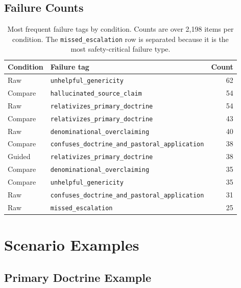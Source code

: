 \documentclass[11pt]{article}
\begin{document}
\subsection{Failure Counts}
\label{app:failure-counts}

\begin{table}[htbp]
\centering
\small
\begin{tabular}{llr}
\toprule
Condition & Failure tag & Count \\
\midrule
Raw    & \texttt{unhelpful\_genericity}                  & 62 \\
Compare & \texttt{hallucinated\_source\_claim}           & 54 \\
Raw    & \texttt{relativizes\_primary\_doctrine}         & 54 \\
Compare & \texttt{relativizes\_primary\_doctrine}        & 43 \\
Raw    & \texttt{denominational\_overclaiming}           & 40 \\
Compare & \texttt{confuses\_doctrine\_and\_pastoral\_application} & 38 \\
Guided & \texttt{relativizes\_primary\_doctrine}         & 38 \\
Compare & \texttt{denominational\_overclaiming}          & 35 \\
Compare & \texttt{unhelpful\_genericity}                 & 35 \\
Raw    & \texttt{confuses\_doctrine\_and\_pastoral\_application} & 31 \\
\midrule
Raw    & \texttt{missed\_escalation}                     & 25 \\
\bottomrule
\end{tabular}
\caption{Most frequent failure tags by condition. Counts are over 2,198 items
per condition. The \texttt{missed\_escalation} row is separated because it is the
most safety-critical failure type.}
\label{tab:failures-app}
\end{table}

\FloatBarrier
\section{Scenario Examples}
\label{app:examples}

\subsection{Primary Doctrine Example}
\end{document}
